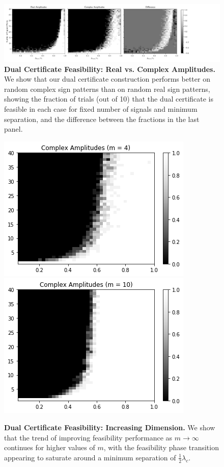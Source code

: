 \documentclass[11pt]{article}
\newcommand{\HS}{\hspace{3.5mm}}
\begin{document}
\clearpage
\begin{figure}[!h]
    \begin{center}
        \includegraphics[trim={0 0 5cm 0},scale=0.5]{../img/real-vs-complex.pdf}
    \end{center}
    \vspace{-0.75cm}
    \caption{\textbf{Dual Certificate Feasibility: Real vs. Complex Amplitudes.} We show that our dual certificate construction performs better on random complex sign patterns than on random real sign patterns, showing the fraction of trials (out of 10) that the dual certificate is feasible in each case for fixed number of signals and minimum separation, and the difference between the fractions in the last panel.}
    \label{fig:real-complex}
\end{figure}
\begin{figure}[!h]
    \begin{center}
        \hspace{-0.6cm}
        \includegraphics[scale=0.5]{../img/results-m=4.png}
        \HS \HS \HS
        \includegraphics[scale=0.5]{../img/results-m=10.png}
    \end{center}
    \vspace{-0.75cm}
    \caption{\textbf{Dual Certificate Feasibility: Increasing Dimension.} We show that the trend of improving feasibility performance as $m \to \infty$ continues for higher values of $m$, with the feasibility phase transition appearing to saturate around a minimum separation of $\frac{1}{2}\lambda_c$.}
    \label{fig:higher-m}
\end{figure}
\end{document}
